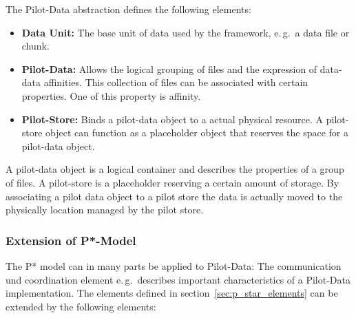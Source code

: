 \documentclass[conference,final]{IEEEtran}
\begin{document}
The Pilot-Data abstraction defines the following elements:
\begin{itemize}
    \item \textbf{Data Unit:} The base unit of data used by the framework, e.\,g.\ a data 
    file or chunk.
    \item \textbf{Pilot-Data:} Allows the logical grouping of files and the expression of data-data affinities. This collection of files can be associated with certain properties. One of this property is affinity.    
    \item\textbf{ Pilot-Store:} Binds a pilot-data object to a actual physical resource. A pilot-store object can function as a placeholder object that reserves the space for a pilot-data object.
\end{itemize}
A pilot-data object is a logical container and describes the properties of a 
group of files. A pilot-store is a placeholder reserving a certain amount of 
storage. By associating a pilot data object to a pilot store the data is 
actually moved to the physically location managed by the pilot store.

	

\subsubsection{Extension of P*-Model}

The P* model can in many parts be applied to Pilot-Data: The communication und
coordination element e.\,g.\ describes important characteristics of a Pilot-Data
implementation. The elements defined in section~\ref{sec:p_star_elements} can be
extended by the following elements:
\end{document}
